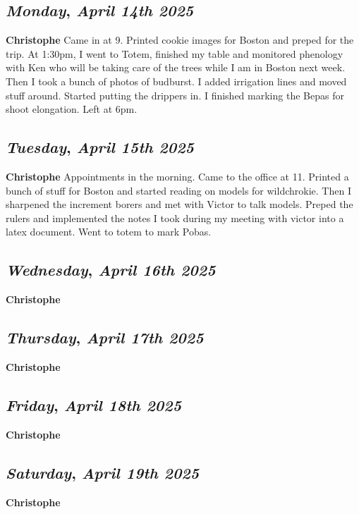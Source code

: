 \def\day{\textit{April 14th 2025}}
\def\weekday{\textit{Monday}}
\subsection*{\weekday, \day}
\textbf {Christophe}
Came in at 9. Printed cookie images for Boston and preped for the trip. At 1:30pm, I went to Totem, finished my table and monitored phenology with Ken who will be taking care of the trees while I am in Boston next week. Then I took a bunch of photos of budburst. I added irrigation lines and moved stuff around. Started putting the drippers in. I finished marking the Bepas for shoot elongation. Left at 6pm. 

\def\day{\textit{April 15th 2025}}
\def\weekday{\textit{Tuesday}}
\subsection*{\weekday, \day}
\textbf {Christophe}
Appointments in the morning. Came to the office at 11. Printed a bunch of stuff for Boston and started reading on models for wildchrokie. Then I sharpened the increment borers and met with Victor to talk models. Preped the rulers and implemented the notes I took during my meeting with victor into a latex document. Went to totem to mark Pobas. 
\def\day{\textit{April 16th 2025}}
\def\weekday{\textit{Wednesday}}
\subsection*{\weekday, \day}
\textbf {Christophe}

\def\day{\textit{April 17th 2025}}
\def\weekday{\textit{Thursday}}
\subsection*{\weekday, \day}
\textbf {Christophe}

\def\day{\textit{April 18th 2025}}
\def\weekday{\textit{Friday}}
\subsection*{\weekday, \day}
\textbf {Christophe}

\def\day{\textit{April 19th 2025}}
\def\weekday{\textit{Saturday}}
\subsection*{\weekday, \day}
\textbf {Christophe}

